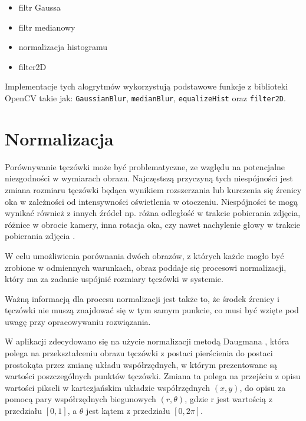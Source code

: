 \begin{itemize}
  \item filtr Gaussa
  \item filtr medianowy
  \item normalizacja histogramu
  \item filter2D
\end{itemize}

Implementacje tych alogrytmów wykorzystują podstawowe funkcje z biblioteki OpenCV takie jak:
\verb|GaussianBlur|, \verb|medianBlur|, \verb|equalizeHist| oraz \verb|filter2D|.

\section{Normalizacja}

Porównywanie tęczówki może by\'c problematyczne, ze względu na potencjalne niezgodności w
wymiarach obrazu. Najczęstszą przyczyną tych niespójności jest zmiana rozmiaru tęczówki
będąca wynikiem rozszerzania lub kurczenia się  \'zrenicy oka w zależności od intensywności
oświetlenia w otoczeniu. Niespójności te mogą wynika\'c również z innych \'zródeł np. różna
odległoś\'c w trakcie pobierania zdjęcia, różnice w obrocie kamery, inna rotacja oka, czy
nawet nachylenie głowy w trakcie pobierania zdjęcia \cite{DaugmanHowIrisRecognitionWorks}.\newline

W celu umożliwienia porównania dwóch obrazów, z których każde mogło by\'c zrobione w odmiennych
warunkach, obraz poddaje się procesowi normalizacji, który ma za zadanie uspójni\'c rozmiary
tęczówki w systemie.

\noindent
Ważną informacją dla procesu normalizacji jest także to, że środek \'zrenicy i tęczówki nie
muszą znajdowa\'c się w tym samym punkcie, co musi by\'c wzięte pod uwagę przy opracowywaniu
rozwiązania.\newline

W aplikacji zdecydowano się na użycie normalizacji metodą Daugmana \cite{DaugmanHowIrisRecognitionWorks}, która polega na przekształceniu
obrazu tęczówki z postaci pierścienia do postaci prostokąta przez zmianę układu współrzędnych, w którym
prezentowane są wartości poszczególnych punktów tęczówki. Zmiana ta polega na przejściu z opisu
wartości pikseli w kartezjańskim układzie współrzędnych $(x,y)$, do opisu za pomocą pary
współrzędnych biegunowych $(r, \theta)$, gdzie r jest wartością z przedziału $[0,1]$, a $\theta$ jest kątem
z przedziału $[0, 2\pi]$.\newline

